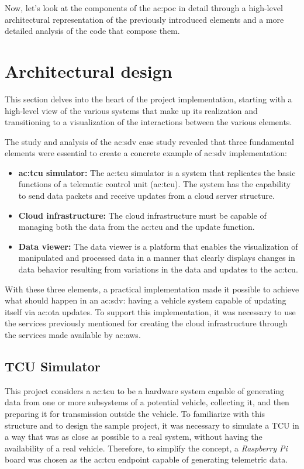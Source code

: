 Now, let's look at the components of the \gls{ac:poc} in detail through a high-level architectural representation of the previously introduced elements and a more detailed analysis of the code that compose them.

\section{Architectural design}
This section delves into the heart of the project implementation, starting with a high-level view of the various systems that make up its realization and transitioning to a visualization of the interactions between the various elements.

The study and analysis of the \gls{ac:sdv} case study revealed that three fundamental elements were essential to create a concrete example of \gls{ac:sdv} implementation:
\begin{itemize}
    \item \textbf{\gls{ac:tcu} simulator:} The \gls{ac:tcu} simulator is a system that replicates the basic functions of a telematic control unit (\gls{ac:tcu}). The system has the capability to send data packets and receive updates from a cloud server structure.
    \item \textbf{Cloud infrastructure:} The cloud infrastructure must be capable of managing both the data from the \gls{ac:tcu} and the update function.
    \item \textbf{Data viewer:}  The data viewer is a platform that enables the visualization of manipulated and processed data in a manner that clearly displays changes in data behavior resulting from variations in the data and updates to the \gls{ac:tcu}.
\end{itemize}

With these three elements, a practical implementation made it possible to achieve what should happen in an \gls{ac:sdv}: having a vehicle system capable of updating itself via \gls{ac:ota} updates. To support this implementation, it was necessary to use the services previously mentioned for creating the cloud infrastructure through the services made available by \gls{ac:aws}.

\subsection{TCU Simulator}
This project considers a \gls{ac:tcu} to be a hardware system capable of generating data from one or more subsystems of a potential vehicle, collecting it, and then preparing it for transmission outside the vehicle. To familiarize with this structure and to design the sample project, it was necessary to simulate a TCU in a way that was as close as possible to a real system, without having the availability of a real vehicle. Therefore, to simplify the concept, a \textit{Raspberry Pi} board was chosen as the \gls{ac:tcu} endpoint capable of generating telemetric data.

